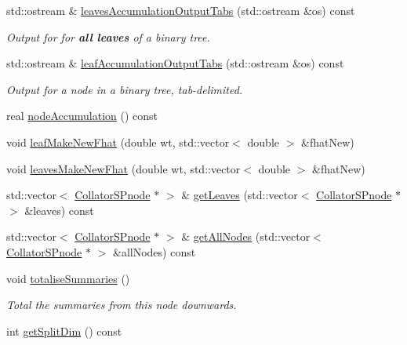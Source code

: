 \begin{DoxyCompactItemize}
std\-::ostream \& \hyperlink{classsubpavings_1_1CollatorSPnode_a406e23c3f85680631bd30897fb1cfdc2}{leaves\-Accumulation\-Output\-Tabs} (std\-::ostream \&os) const 
\begin{DoxyCompactList}\small\item\em \-Output for for {\bfseries all leaves} of a binary tree. \end{DoxyCompactList}\item 
std\-::ostream \& \hyperlink{classsubpavings_1_1CollatorSPnode_a0ea530d232bf3bb09e6cf44eeeadbfde}{leaf\-Accumulation\-Output\-Tabs} (std\-::ostream \&os) const 
\begin{DoxyCompactList}\small\item\em \-Output for a node in a binary tree, tab-\/delimited. \end{DoxyCompactList}\item 
real \hyperlink{classsubpavings_1_1CollatorSPnode_a812d98c784af382c4a697555a7b0445f}{node\-Accumulation} () const 
\item 
void \hyperlink{classsubpavings_1_1CollatorSPnode_acdad2b87cf5f979fb24a7aef392a5895}{leaf\-Make\-New\-Fhat} (double wt, std\-::vector$<$ double $>$ \&fhat\-New)
\item 
void \hyperlink{classsubpavings_1_1CollatorSPnode_a236e44d75b1cf0988a014f7ae33c55b6}{leaves\-Make\-New\-Fhat} (double wt, std\-::vector$<$ double $>$ \&fhat\-New)
\item 
std\-::vector$<$ \hyperlink{classsubpavings_1_1CollatorSPnode}{\-Collator\-S\-Pnode} $\ast$ $>$ \& \hyperlink{classsubpavings_1_1CollatorSPnode_a827a6e8b21b3c6e8e8f8e9aeca4b622b}{get\-Leaves} (std\-::vector$<$ \hyperlink{classsubpavings_1_1CollatorSPnode}{\-Collator\-S\-Pnode} $\ast$ $>$ \&leaves) const 
\item 
std\-::vector$<$ \hyperlink{classsubpavings_1_1CollatorSPnode}{\-Collator\-S\-Pnode} $\ast$ $>$ \& \hyperlink{classsubpavings_1_1CollatorSPnode_a7fa06e6f1d278157e7c5c6a9d44e2c07}{get\-All\-Nodes} (std\-::vector$<$ \hyperlink{classsubpavings_1_1CollatorSPnode}{\-Collator\-S\-Pnode} $\ast$ $>$ \&all\-Nodes) const 
\item 
void \hyperlink{classsubpavings_1_1CollatorSPnode_a0e8574a8a951a2716cbb29b8e1fbbc33}{totalise\-Summaries} ()
\begin{DoxyCompactList}\small\item\em \-Total the summaries from this node downwards. \end{DoxyCompactList}\item 
int \hyperlink{classsubpavings_1_1CollatorSPnode_ab374777116b7e0af8e7100f303e1f97b}{get\-Split\-Dim} () const 

\end{DoxyCompactItemize}
